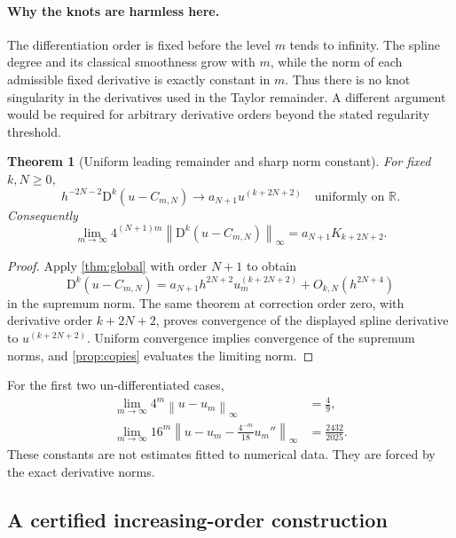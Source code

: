 \documentclass[11pt,a4paper]{article}
\numberwithin{equation}{section}
\newtheorem{theorem}{Theorem}[section]
\theoremstyle{definition}
\newcommand{\R}{\mathbb R}
\newcommand{\D}{\mathrm D}
\newcommand{\norm}[1]{\left\lVert #1\right\rVert}
\begin{document}
\paragraph{Why the knots are harmless here.}
The differentiation order is fixed before the level $m$ tends to
infinity. The spline degree and its classical smoothness grow with
$m$, while the norm of each admissible fixed derivative is exactly
constant in $m$. Thus there is no knot singularity in the derivatives
used in the Taylor remainder. A different argument would be required
for arbitrary derivative orders beyond the stated regularity threshold.

\begin{theorem}[Uniform leading remainder and sharp norm constant]\label{thm:sharp}
For fixed $k,N\geq0$,
\begin{equation}
 h^{-2N-2}\D^k(u-C_{m,N})
 \longrightarrow a_{N+1}u^{(k+2N+2)}
 \quad\text{uniformly on }\R.
 \label{eq:leading-remainder}
\end{equation}
Consequently
\begin{equation}
 \lim_{m\to\infty}4^{(N+1)m}
       \norm{\D^k(u-C_{m,N})}_\infty
       =a_{N+1}K_{k+2N+2}.
 \label{eq:sharp-limit}
\end{equation}
\end{theorem}
\begin{proof}
Apply \cref{thm:global} with order $N+1$ to obtain
\begin{equation}
 \D^k(u-C_{m,N})
 =a_{N+1}h^{2N+2}u_m^{(k+2N+2)}+O_{k,N}(h^{2N+4})
\end{equation}
in the supremum norm. The same theorem at correction order zero,
with derivative order $k+2N+2$, proves convergence of the displayed
spline derivative to $u^{(k+2N+2)}$. Uniform convergence implies
convergence of the supremum norms, and \cref{prop:copies} evaluates
the limiting norm.
\end{proof}

For the first two un-differentiated cases,
\begin{align}
 \lim_{m\to\infty}4^m\norm{u-u_m}_\infty&=\frac49,\label{eq:sharp-first}\\
 \lim_{m\to\infty}16^m
 \left\|u-u_m-\frac{4^{-m}}{18}u_m''\right\|_\infty
 &=\frac{2432}{2025}.
 \label{eq:sharp-second}
\end{align}
These constants are not estimates fitted to numerical data.
They are forced by the exact derivative norms.

\subsection{A certified increasing-order construction}
\end{document}
